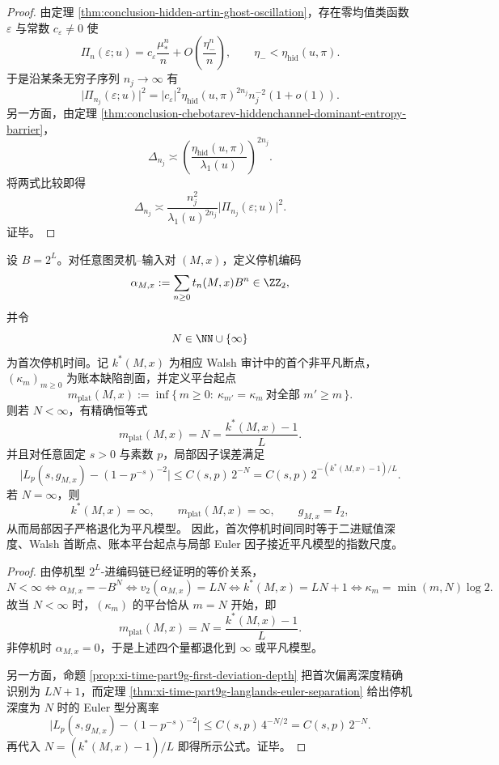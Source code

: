 \begin{proof}
由定理 \ref{thm:conclusion-hidden-artin-ghost-oscillation}，存在零均值类函数 \(\varepsilon\) 与常数 \(c_\varepsilon\neq 0\) 使
\[
\Pi_n(\varepsilon;u)
=
c_\varepsilon\frac{\mu_\ast^n}{n}
+
O\!\left(\frac{\eta_-^n}{n}\right),
\qquad
\eta_-<\eta_{\mathrm{hid}}(u,\pi).
\]
于是沿某条无穷子序列 \(n_j\to\infty\) 有
\[
\bigl|\Pi_{n_j}(\varepsilon;u)\bigr|^2
=
|c_\varepsilon|^2\eta_{\mathrm{hid}}(u,\pi)^{2n_j}n_j^{-2}(1+o(1)).
\]
另一方面，由定理 \ref{thm:conclusion-chebotarev-hiddenchannel-dominant-entropy-barrier}，
\[
\Delta_{n_j}
\asymp
\left(\frac{\eta_{\mathrm{hid}}(u,\pi)}{\lambda_1(u)}\right)^{2n_j}.
\]
将两式比较即得
\[
\Delta_{n_j}
\asymp
\frac{n_j^2}{\lambda_1(u)^{2n_j}}
\bigl|\Pi_{n_j}(\varepsilon;u)\bigr|^2.
\]
证毕。
\end{proof}

\begin{theorem}\label{thm:conclusion-halting-walsh-plateau-localfactor-locking}
设 \(B=2^L\)。对任意图灵机--输入对 \((M,x)\)，定义停机编码
\[
\alpha_{M,x}:=\sum_{n\ge 0} t_n(M,x)B^n\in \ZZ_2,
\]
并令
\[
N\in\NN\cup\{\infty\}
\]
为首次停机时间。记 \(k^\ast(M,x)\) 为相应 Walsh 审计中的首个非平凡断点，\((\kappa_m)_{m\ge 0}\) 为账本缺陷剖面，并定义平台起点
\[
m_{\mathrm{plat}}(M,x)
:=
\inf\{\,m\ge 0:\ \kappa_{m'}=\kappa_m\ \text{对全部 }m'\ge m\,\}.
\]
则若 \(N<\infty\)，有精确恒等式
\[
m_{\mathrm{plat}}(M,x)=N=\frac{k^\ast(M,x)-1}{L}.
\]
并且对任意固定 \(s>0\) 与素数 \(p\)，局部因子误差满足
\[
\bigl|L_p(s,g_{M,x})-(1-p^{-s})^{-2}\bigr|
\le
C(s,p)\,2^{-N}
=
C(s,p)\,2^{-(k^\ast(M,x)-1)/L}.
\]
若 \(N=\infty\)，则
\[
k^\ast(M,x)=\infty,\qquad
m_{\mathrm{plat}}(M,x)=\infty,\qquad
g_{M,x}=I_2,
\]
从而局部因子严格退化为平凡模型。
因此，首次停机时间同时等于二进赋值深度、Walsh 首断点、账本平台起点与局部 Euler 因子接近平凡模型的指数尺度。
\end{theorem}

\begin{proof}
由停机型 \(2^L\)-进编码链已经证明的等价关系，
\[
N<\infty
\iff
\alpha_{M,x}=-B^N
\iff
v_2(\alpha_{M,x})=LN
\iff
k^\ast(M,x)=LN+1
\iff
\kappa_m=\min(m,N)\log 2.
\]
故当 \(N<\infty\) 时，\((\kappa_m)\) 的平台恰从 \(m=N\) 开始，即
\[
m_{\mathrm{plat}}(M,x)=N=\frac{k^\ast(M,x)-1}{L}.
\]
非停机时 \(\alpha_{M,x}=0\)，于是上述四个量都退化到 \(\infty\) 或平凡模型。

另一方面，命题 \ref{prop:xi-time-part9g-first-deviation-depth} 把首次偏离深度精确识别为 \(LN+1\)，而定理 \ref{thm:xi-time-part9g-langlands-euler-separation} 给出停机深度为 \(N\) 时的 Euler 型分离率
\[
\bigl|L_p(s,g_{M,x})-(1-p^{-s})^{-2}\bigr|
\le
C(s,p)\,4^{-N/2}
=
C(s,p)\,2^{-N}.
\]
再代入
\(
N=(k^\ast(M,x)-1)/L
\)
即得所示公式。证毕。
\end{proof}

